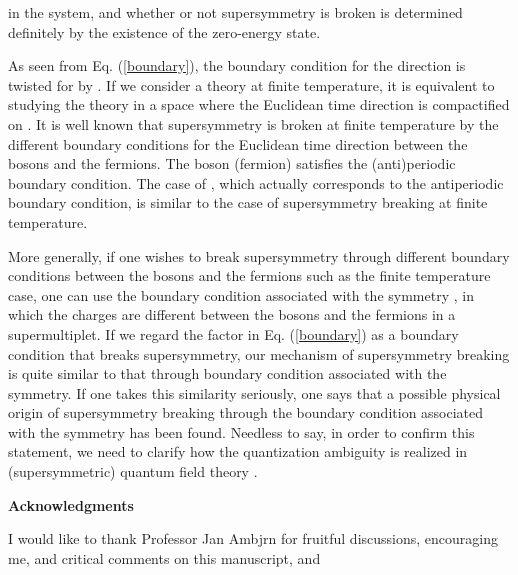 \documentclass[a4paper,12pt]{article}
\begin{document}
{{in the system, and whether 
or not supersymmetry is broken is determined definitely
by the existence of the zero-energy state. 
\par
As seen from Eq. (\ref{boundary}), the boundary condition for the \coordHE{} 
direction is twisted for \coordHE{} by \coordHE{}. 
If we consider a theory at finite temperature, it is equivalent to studying
the theory in a space where the Euclidean time direction 
is compactified on \coordHE{}. 
It is well known that supersymmetry is broken at finite
temperature by the different boundary conditions 
for the Euclidean time direction between the bosons and the fermions. 
The boson (fermion) satisfies 
the (anti)periodic boundary condition. The case of \coordHE{}, which 
actually corresponds to the antiperiodic boundary condition, is similar
to the case of supersymmetry breaking at finite temperature. 
\par  
More generally, if one wishes to break 
supersymmetry through different boundary conditions between the 
bosons and the fermions such as the finite temperature case, one can use 
the boundary
condition associated with the \coordHE{} symmetry \cite{scherk}\cite{fayet}
\cite{takenaga}, in which the \coordHE{} charges 
are different between the bosons 
and the fermions in a supermultiplet. If we regard the factor
\coordHE{} in Eq. (\ref{boundary}) as 
a boundary condition that breaks supersymmetry, our mechanism 
of supersymmetry breaking is quite similar to 
that through boundary condition associated with the \coordHE{} symmetry. 
If one takes this similarity seriously, one says that  
a possible physical origin of supersymmetry breaking 
through the boundary condition associated with the \coordHE{} symmetry
has been found. Needless to say, in order to confirm this 
statement, we need to 
clarify how the quantization ambiguity is realized in (supersymmetric) 
quantum field theory \cite{zee}.
\par
\vskip 2cm
\begin{center}
{\bf Acknowledgments}
\end{center}
\vspace{10pt}
I would like to thank Professor Jan Ambj{\rm \myHighlight{$\phi$}\coordHE{}}rn for fruitful 
discussions, encouraging me, and critical comments on this manuscript, and 
}}
\end{document}
